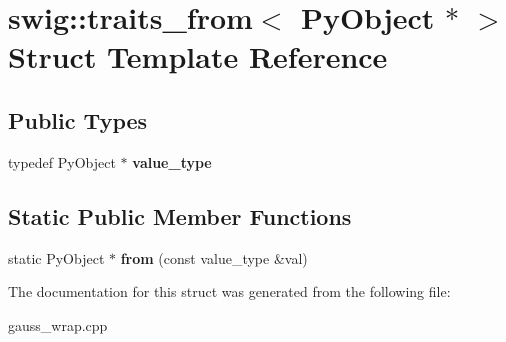 \hypertarget{structswig_1_1traits__from_3_01_py_object_01_5_01_4}{\section{swig\-:\-:traits\-\_\-from$<$ Py\-Object $\ast$ $>$ Struct Template Reference}
\label{structswig_1_1traits__from_3_01_py_object_01_5_01_4}
}
\subsection*{Public Types}
\begin{DoxyCompactItemize}
\item 
\hypertarget{structswig_1_1traits__from_3_01_py_object_01_5_01_4_a3f736b20ca687eb0894c64d1b8ec2b11}{typedef Py\-Object $\ast$ {\bfseries value\-\_\-type}}\label{structswig_1_1traits__from_3_01_py_object_01_5_01_4_a3f736b20ca687eb0894c64d1b8ec2b11}

\end{DoxyCompactItemize}
\subsection*{Static Public Member Functions}
\begin{DoxyCompactItemize}
\item 
\hypertarget{structswig_1_1traits__from_3_01_py_object_01_5_01_4_ab383a520e9f35b0d778819da07efd42d}{static Py\-Object $\ast$ {\bfseries from} (const value\-\_\-type \&val)}\label{structswig_1_1traits__from_3_01_py_object_01_5_01_4_ab383a520e9f35b0d778819da07efd42d}

\end{DoxyCompactItemize}


The documentation for this struct was generated from the following file\-:\begin{DoxyCompactItemize}
\item 
gauss\-\_\-wrap.\-cpp\end{DoxyCompactItemize}
